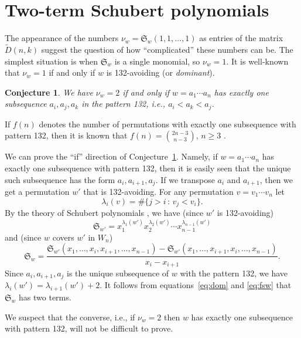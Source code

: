 \documentclass[12pt]{amsart}
\newtheorem{conj}[thm]{Conjecture}
\theoremstyle{definition}
\theoremstyle{remark}
\numberwithin{equation}{section}
\begin{document}
   \section{Two-term Schubert polynomials}
The appearance of the numbers $\nu_w={\mathfrak{S}}_w(1,1,\dots,1)$ as entries of
the matrix $\tilde{D}(n,k)$ suggest the question of how ``complicated'' these
numbers can be. The simplest situation is when ${\mathfrak{S}}_w$ is a single
monomial, so $\nu_w=1$. It is well-known \cite{macd} that $\nu_w=1$ if
and only if  $w$ is 132-avoiding (or \emph{dominant}).

\begin{conj} \label{conj:two}
We have $\nu_w=2$ if and only if $w=a_1\cdots a_n$ has exactly one
subsequence $a_i,a_j,a_k$ in the pattern 132, i.e., $a_i<a_k<a_j$. 
\end{conj}

If $f(n)$ denotes the number of permutations with exactly one
subsequence with pattern 132, then it is known that
$f(n)=\binom{2n-3}{n-3}$, $n\geq 3$ \cite[eqn.~(2)]{bona}.

We can prove the ``if'' direction of
Conjecture~\ref{conj:two}. Namely, if $w=a_1\cdots a_n$ has exactly
one subsequence with pattern 132, then it is easily seen that the
unique such subsequence has the form $a_i,a_{i+1},a_j$. If we
transpose $a_i$ and 
$a_{i+1}$, then we get a permutation $w'$ that is 132-avoiding. For
any permutation $v=v_1\cdots v_n$ let
  $$ \lambda_i(v) = \#\{j>i{\,:\,} v_j<v_i\}. $$
By the theory of Schubert
polynomials \cite{macd}, we have (since $w'$ is 132-avoiding)
  \begin{equation} {\mathfrak{S}}_{w'} = x_1^{\lambda_1(w')}x_2^{\lambda_2(w')}\cdots
  x_{n-1}^{\lambda_{n-1}(w')} \label{eq:dom} \end{equation}
and (since $w$ covers $w'$ in $W_n$)
  \begin{equation} {\mathfrak{S}}_w = \frac{{\mathfrak{S}}_{w'}(x_1,\dots,x_i,x_{i+1},\dots,x_{n-1})-
    {\mathfrak{S}}_{w'}(x_1,\dots,x_{i+1},x_i,\dots,x_{n-1})}{x_i-x_{i+1}}.
     \label{eq:fsw} \end{equation}
Since $a_i,a_{i+1},a_j$ is the unique subsequence of $w$ with the
pattern 132, we have $\lambda_i(w')=\lambda_{i+1}(w')+2$. It follows
from equations~\eqref{eq:dom} and \eqref{eq:fsw} that ${\mathfrak{S}}_w$ has two
terms. 
    
We suspect that the converse, i.e., if $\nu_w=2$ then $w$ has exactly
one subsequence with pattern 132, will not be difficult to prove. 
\end{document}
